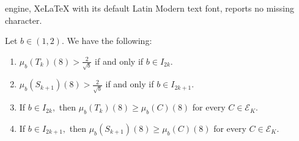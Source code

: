 \documentclass[10pt,a4paper]{amsart}
\begin{document}
engine, XeLaTeX with its default Latin Modern text font, reports no missing character.
\begin{lem}\label{sktksupports}
Let $b \in (1, 2).$ We have the following:
\begin{enumerate}
    \item $\mu_b(T_k)(8) > \frac{2}{\sqrt{b}}$ if and only if $b \in I_{2k}.$
    \item $\mu_b(S_{k+1})(8) > \frac{2}{\sqrt{b}}$ if and only if $b \in I_{2k+1}.$
    \item If $b \in I_{2k},$ then $\mu_b(T_k)(8) \ge \mu_b(C)(8)$ for every $C \in \mathcal{E}_K.$
    \item If $b \in I_{2k+1},$ then $\mu_b(S_{k+1})(8) \ge \mu_b(C)(8)$ for every $C \in \mathcal{E}_K.$
\end{enumerate}
\end{lem}
\end{document}
